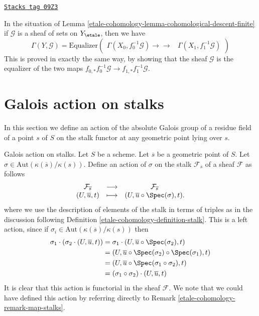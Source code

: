 \begin{remark}
\label{etale-cohomology-remark-cohomological-descent-finite}
\href{https://stacks.math.columbia.edu/tag/09Z3}{\texttt{Stacks tag 09Z3}}

In the situation of Lemma \ref{etale-cohomology-lemma-cohomological-descent-finite}
if $\mathcal{G}$ is a sheaf of sets on $Y_\etale$, then we have
$$
\Gamma(Y, \mathcal{G}) =
\text{Equalizer}(
\begin{array}{cc}\Gamma(X_0, f_0^{-1}\mathcal{G})
\longrightarrow\longrightarrow & \Gamma(X_1, f_1^{-1}\mathcal{G})\end{array}
)
$$
This is proved in exactly the same way, by showing that
the sheaf $\mathcal{G}$ is the equalizer of the two maps
$f_{0, *}f_0^{-1}\mathcal{G} \to f_{1, *}f_1^{-1}\mathcal{G}$.
\end{remark}



\section{Galois action on stalks}
\label{etale-cohomology-section-galois-action-stalks}
In this section we define an action of the absolute Galois group of a residue
field of a point $s$ of $S$ on the stalk functor at any geometric point lying
over $s$.

\medskip\noindent
Galois action on stalks.
Let $S$ be a scheme.
Let $\overline{s}$ be a geometric point of $S$.
Let $\sigma \in \text{Aut}(\kappa(\overline{s})/\kappa(s))$.
Define an action of $\sigma$ on the stalk $\mathcal{F}_{\overline{s}}$
of a sheaf $\mathcal{F}$ as follows
\begin{equation}
\label{equation-galois-action}
\begin{matrix}
\mathcal{F}_{\overline{s}} &
\longrightarrow &
\mathcal{F}_{\overline{s}} \\
(U, \overline{u}, t) &
\longmapsto &
(U, \overline{u} \circ \Spec(\sigma), t).
\end{matrix}
\end{equation}
where we use the description of elements of the stalk in terms of triples
as in the discussion following
Definition \ref{etale-cohomology-definition-stalk}.
This is a left action, since if
$\sigma_i \in \text{Aut}(\kappa(\overline{s})/\kappa(s))$
then
\begin{align*}
\sigma_1 \cdot (\sigma_2 \cdot (U, \overline{u}, t))
& =
\sigma_1 \cdot (U, \overline{u} \circ \Spec(\sigma_2), t) \\
& =
(U, \overline{u} \circ \Spec(\sigma_2) \circ \Spec(\sigma_1), t) \\
& =
(U, \overline{u} \circ \Spec(\sigma_1 \circ \sigma_2), t) \\
& =
(\sigma_1 \circ \sigma_2) \cdot (U, \overline{u}, t)
\end{align*}
It is clear that this action is functorial in the sheaf $\mathcal{F}$.
We note that we could have defined this action by referring directly to
Remark \ref{etale-cohomology-remark-map-stalks}.

